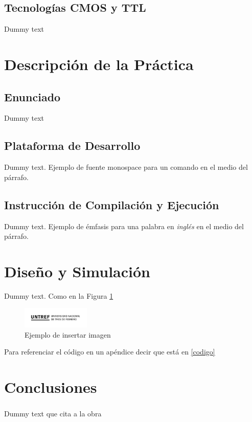 \documentclass{article}
\let\originalcite\cite
\renewcommand{\cite}[2][]{\textsuperscript{\originalcite{#2}}}
\begin{document}
\subsection*{Tecnologías CMOS y TTL}
Dummy text

\section{Descripción de la Práctica}

\subsection{Enunciado}
Dummy text

\subsection{Plataforma de Desarrollo}
Dummy text. Ejemplo de fuente monospace {\ttfamily para un comando} en el medio del párrafo.

\subsection{Instrucción de Compilación y Ejecución}
Dummy text. Ejemplo de émfasis para una palabra en \textit{inglés} en el medio del párrafo.

\section{Diseño y Simulación}
Dummy text. Como en la Figura \ref{imagen}

\begin{figure}[h]
    \centering
    \includegraphics[height=1cm]{logo.png}
    \caption{Ejemplo de insertar imagen}
    \label{imagen}
\end{figure}
\clearpage 

Para referenciar el código en un apéndice decir que está en \ref{codigo}

\section{Conclusiones}
Dummy text que cita a la obra \cite{boylestad}
\end{document}
